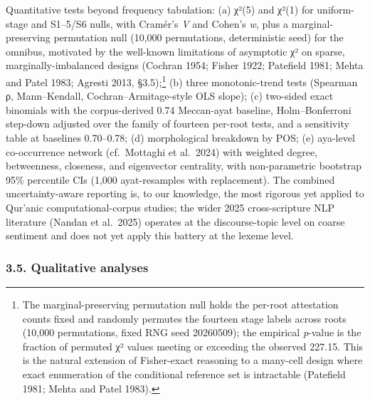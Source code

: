 Quantitative tests beyond frequency tabulation: (a) χ²(5) and χ²(1) for
uniform-stage and S1--5/S6 nulls, with Cramér's \emph{V} and Cohen's
\emph{w}, plus a marginal-preserving permutation null (10,000
permutations, deterministic seed) for the omnibus, motivated by the
well-known limitations of asymptotic χ² on sparse, marginally-imbalanced
designs (Cochran 1954; Fisher 1922; Patefield 1981; Mehta and Patel
1983; Agresti 2013, §3.5);\footnote{The marginal-preserving permutation
  null holds the per-root attestation counts fixed and randomly permutes
  the fourteen stage labels across roots (10,000 permutations, fixed RNG
  seed 20260509); the empirical \emph{p}-value is the fraction of
  permuted χ² values meeting or exceeding the observed 227.15. This is
  the natural extension of Fisher-exact reasoning to a many-cell design
  where exact enumeration of the conditional reference set is
  intractable (Patefield 1981; Mehta and Patel 1983).} (b) three
monotonic-trend tests (Spearman ρ, Mann--Kendall,
Cochran--Armitage-style OLS slope); (c) two-sided exact binomials with
the corpus-derived 0.74 Meccan-ayat baseline, Holm--Bonferroni step-down
adjusted over the family of fourteen per-root tests, and a sensitivity
table at baselines 0.70--0.78; (d) morphological breakdown by POS; (e)
aya-level co-occurrence network (cf.~Mottaghi et al.~2024) with weighted
degree, betweenness, closeness, and eigenvector centrality, with
non-parametric bootstrap 95\% percentile CIs (1,000 ayat-resamples with
replacement). The combined uncertainty-aware reporting is, to our
knowledge, the most rigorous yet applied to Qur'anic
computational-corpus studies; the wider 2025 cross-scripture NLP
literature (Nandan et al.~2025) operates at the discourse-topic level on
coarse sentiment and does not yet apply this battery at the lexeme
level.

\subsubsection{3.5. Qualitative analyses}\label{qualitative-analyses}

